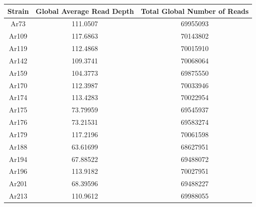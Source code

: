 \documentclass[../main.tex]{subfiles}
\begin{document}
%
%
\begin{table}[H]
\begin{center}
	 \label{tab:CV_res}
\begin{tabular}{ |c|c|c| }
		\hline
		Strain & Global Average Read Depth & Total Global Number of Reads \\
		\hline
		Ar73 & 111.0507 & 69955093\\
		\hline
		Ar109 & 117.6863 & 70143802\\
		\hline
		Ar119 & 112.4868 & 70015910\\
		\hline
		Ar142 & 109.3741 & 70068064\\
		\hline
		Ar159 & 104.3773 & 69875550\\
		\hline
		Ar170 & 112.3987 & 70033946\\
		\hline
		Ar174 & 113.4283 & 70022954\\
		\hline
		Ar175 & 73.79959 & 69545937\\
		\hline
		Ar176 & 73.21531 & 69583274\\
		\hline
		Ar179 & 117.2196 & 70061598\\
		\hline
		Ar188 & 63.61699 & 68627951\\
		\hline
		Ar194 & 67.88522 & 69488072\\
		\hline
		Ar196 & 113.9182 & 70027951\\
		\hline
		Ar201 & 68.39596 & 69488227\\
		\hline
		Ar213 & 110.9612 & 69988055\\
		\hline
\end{tabular}
\end{center}
\end{table}
\newpage
\end{document}
